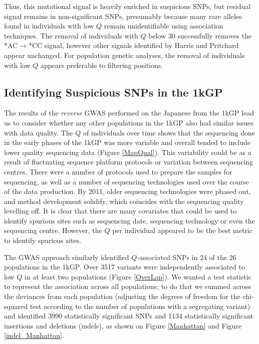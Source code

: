 \documentclass[9pt,lineno]{elife}
\begin{document}
Thus, this mutational signal is heavily enriched in suspicious SNPs, but residual signal remains in non-significant SNPs, presumably because many rare alleles found in individuals with low $Q$ remain unidentifiable using association techniques. 
The removal of individuals with $Q$ below 30 successfully removes the *AC${\rightarrow}$*CC signal, however other signals identified by Harris and Pritchard appear unchanged. 
For population genetic analyses, the removal of individuals with low $Q$ appears preferable to filtering positions.

	\subsection{Identifying Suspicious SNPs in the 1kGP}
The results of the \textit{reverse} GWAS performed on the Japanese from the 1kGP lead us to consider whether any other populations in the 1kGP also had similar issues with data quality.
The $Q$ of individuals over time shows that the sequencing done in the early phases of the 1kGP was more variable and overall tended to include lower quality sequencing data (Figure \ref{MapQual}).
This variability could be as a result of fluctuating sequence platform protocols or variation between sequencing centres.
There were a number of protocols used to prepare the samples for sequencing, as well as a number of sequencing technologies used over the course of the data production.
By 2011, older sequencing technologies were phased out, and method development solidify, which coincides with the sequencing quality levelling off.
It is clear that there are many covariates that could be used to identify spurious sites such as sequencing date, sequencing technology or even the sequencing centre. 
However, the $Q$ per individual appeared to be the best metric to identify spurious sites.

The GWAS approach similarly identified $Q$-associated SNPs in 24 of the 26 populations in the 1kGP.
Over 3517 variants were independently associated to low $Q$ in at least two populations  (Figure \ref{OverLap}). We wanted a test statistic to represent the association across all populations; to do that we summed across the deviances from each population (adjusting the degrees of freedom for the chi-squared test according to the number of populations with a segregating variant) and identified 3990 statistically significant SNPs and 1134 statistically significant insertions and deletions (indels), as shown on Figure \ref{Manhattan} and Figure \ref{indel_Manhattan}.
\end{document}
